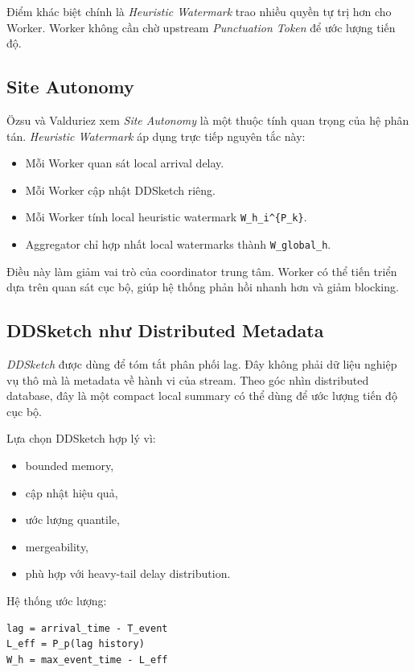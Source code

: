 \documentclass[12pt,a4paper]{article}
\begin{document}
Điểm khác biệt chính là \textit{Heuristic Watermark} trao nhiều quyền tự trị hơn cho Worker. Worker không cần chờ upstream \textit{Punctuation Token} để ước lượng tiến độ.

\subsection{Site Autonomy}

Özsu và Valduriez xem \textit{Site Autonomy} là một thuộc tính quan trọng của hệ phân tán. \textit{Heuristic Watermark} áp dụng trực tiếp nguyên tắc này:

\begin{itemize}
    \item Mỗi Worker quan sát local arrival delay.
    \item Mỗi Worker cập nhật DDSketch riêng.
    \item Mỗi Worker tính local heuristic watermark \texttt{W\_h\_i\textasciicircum\{P\_k\}}.
    \item Aggregator chỉ hợp nhất local watermarks thành \texttt{W\_global\_h}.
\end{itemize}

Điều này làm giảm vai trò của coordinator trung tâm. Worker có thể tiến triển dựa trên quan sát cục bộ, giúp hệ thống phản hồi nhanh hơn và giảm blocking.

\subsection{DDSketch như Distributed Metadata}

\textit{DDSketch} được dùng để tóm tắt phân phối lag. Đây không phải dữ liệu nghiệp vụ thô mà là metadata về hành vi của stream. Theo góc nhìn distributed database, đây là một compact local summary có thể dùng để ước lượng tiến độ cục bộ.

Lựa chọn DDSketch hợp lý vì:

\begin{itemize}
    \item bounded memory,
    \item cập nhật hiệu quả,
    \item ước lượng quantile,
    \item mergeability,
    \item phù hợp với heavy-tail delay distribution.
\end{itemize}

Hệ thống ước lượng:

\begin{lstlisting}
lag = arrival_time - T_event
L_eff = P_p(lag history)
W_h = max_event_time - L_eff
\end{lstlisting}
\end{document}
